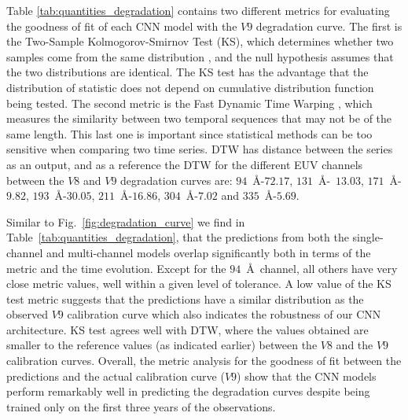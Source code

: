 \documentclass{aa}
\begin{document}
Table \ref{tab:quantities_degradation} contains two different metrics for evaluating the goodness of fit of each CNN model with the $V9$ degradation curve. The first is the Two-Sample Kolmogorov-Smirnov Test (KS), which determines whether two samples come from the same distribution \citep{two_ks}, and the null hypothesis assumes that the two distributions are identical. The KS test has the advantage that the distribution of statistic does not depend on cumulative distribution function being tested. The second metric is the Fast Dynamic Time Warping \citep[DTW, ][]{fastDTW}, which measures the similarity between two temporal sequences that may not be of the same length. This last one is important since statistical methods can be too sensitive when comparing two time series. DTW has distance between the series as an output, and as a reference the DTW for the different EUV channels between the $V8$ and $V9$ degradation curves are: $94$~\AA-$72.17$, $131$~\AA-~$13.03$, $171$~\AA-$9.82$, $193$~\AA-$30.05$, $211$~\AA-$16.86$, $304$~\AA-$7.02$ and $335$~\AA-$5.69$.


Similar to Fig.~\ref{fig:degradation_curve} we find in Table~\ref{tab:quantities_degradation}, that the predictions from both the single-channel and multi-channel models overlap significantly both in terms of the metric and the time evolution. Except for the $94$~\AA~channel, all others have very close metric values, well within a given level of tolerance. A low value of the KS test metric suggests that the predictions have a similar distribution as the observed $V9$ calibration curve which also indicates the robustness of our CNN architecture. KS test agrees well with DTW, where the values obtained are smaller to the reference values (as indicated earlier) between the $V8$ and the $V9$ calibration curves. Overall, the metric analysis for the goodness of fit between the predictions and the actual calibration curve ($V9$) show that the CNN models perform remarkably well in predicting the degradation curves despite being trained only on the first three years of the observations.  
\end{document}
